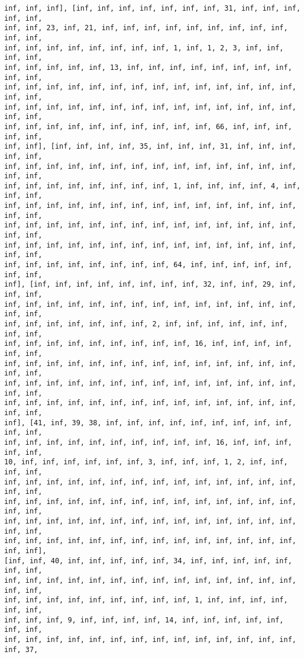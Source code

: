 \documentclass[11pt]{article}
\begin{document}
\begin{Verbatim}[commandchars=\\\{\}]
inf, inf, inf], [inf, inf, inf, inf, inf, inf, inf, 31, inf, inf, inf, inf, inf,
inf, inf, 23, inf, 21, inf, inf, inf, inf, inf, inf, inf, inf, inf, inf, inf,
inf, inf, inf, inf, inf, inf, inf, inf, 1, inf, 1, 2, 3, inf, inf, inf, inf,
inf, inf, inf, inf, inf, 13, inf, inf, inf, inf, inf, inf, inf, inf, inf, inf,
inf, inf, inf, inf, inf, inf, inf, inf, inf, inf, inf, inf, inf, inf, inf, inf,
inf, inf, inf, inf, inf, inf, inf, inf, inf, inf, inf, inf, inf, inf, inf, inf,
inf, inf, inf, inf, inf, inf, inf, inf, inf, inf, 66, inf, inf, inf, inf, inf,
inf, inf], [inf, inf, inf, inf, 35, inf, inf, inf, 31, inf, inf, inf, inf, inf,
inf, inf, inf, inf, inf, inf, inf, inf, inf, inf, inf, inf, inf, inf, inf, inf,
inf, inf, inf, inf, inf, inf, inf, inf, 1, inf, inf, inf, inf, 4, inf, inf, inf,
inf, inf, inf, inf, inf, inf, inf, inf, inf, inf, inf, inf, inf, inf, inf, inf,
inf, inf, inf, inf, inf, inf, inf, inf, inf, inf, inf, inf, inf, inf, inf, inf,
inf, inf, inf, inf, inf, inf, inf, inf, inf, inf, inf, inf, inf, inf, inf, inf,
inf, inf, inf, inf, inf, inf, inf, inf, 64, inf, inf, inf, inf, inf, inf, inf,
inf], [inf, inf, inf, inf, inf, inf, inf, inf, 32, inf, inf, 29, inf, inf, inf,
inf, inf, inf, inf, inf, inf, inf, inf, inf, inf, inf, inf, inf, inf, inf, inf,
inf, inf, inf, inf, inf, inf, inf, 2, inf, inf, inf, inf, inf, inf, inf, inf,
inf, inf, inf, inf, inf, inf, inf, inf, inf, 16, inf, inf, inf, inf, inf, inf,
inf, inf, inf, inf, inf, inf, inf, inf, inf, inf, inf, inf, inf, inf, inf, inf,
inf, inf, inf, inf, inf, inf, inf, inf, inf, inf, inf, inf, inf, inf, inf, inf,
inf, inf, inf, inf, inf, inf, inf, inf, inf, inf, inf, inf, inf, inf, inf, inf,
inf], [41, inf, 39, 38, inf, inf, inf, inf, inf, inf, inf, inf, inf, inf, inf,
inf, inf, inf, inf, inf, inf, inf, inf, inf, inf, 16, inf, inf, inf, inf, inf,
10, inf, inf, inf, inf, inf, inf, 3, inf, inf, inf, 1, 2, inf, inf, inf, inf,
inf, inf, inf, inf, inf, inf, inf, inf, inf, inf, inf, inf, inf, inf, inf, inf,
inf, inf, inf, inf, inf, inf, inf, inf, inf, inf, inf, inf, inf, inf, inf, inf,
inf, inf, inf, inf, inf, inf, inf, inf, inf, inf, inf, inf, inf, inf, inf, inf,
inf, inf, inf, inf, inf, inf, inf, inf, inf, inf, inf, inf, inf, inf, inf, inf],
[inf, inf, 40, inf, inf, inf, inf, inf, 34, inf, inf, inf, inf, inf, inf, inf,
inf, inf, inf, inf, inf, inf, inf, inf, inf, inf, inf, inf, inf, inf, inf, inf,
inf, inf, inf, inf, inf, inf, inf, inf, inf, 1, inf, inf, inf, inf, inf, inf,
inf, inf, inf, 9, inf, inf, inf, inf, 14, inf, inf, inf, inf, inf, inf, inf,
inf, inf, inf, inf, inf, inf, inf, inf, inf, inf, inf, inf, inf, inf, inf, 37,

\end{Verbatim}
\end{document}
